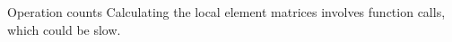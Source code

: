 \documentclass[a4paper,11pt,reqno]{amsart}
\numberwithin{figure}{section}
\numberwithin{table}{section}
\numberwithin{figure}{subsection}
\begin{document}
\begin{section}{Operation counts}
Calculating the local element matrices involves function calls, which could be slow.\\

\end{section}



\end{document}
